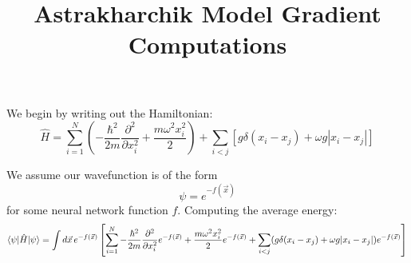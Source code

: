 \documentclass{notes}
\title{Astrakharchik Model Gradient Computations}
\date{}
\begin{document}
	We begin by writing out the Hamiltonian:
	$$\hat{H} = \sum_{i=1}^N \left(-\frac{\hbar^2}{2m}\frac{\partial^2}{\partial x_i^2} + \frac{m\omega^2x_i^2}{2}\right) + \sum_{i<j}\left[g\delta(x_i - x_j) + \omega g |x_i - x_j|\right]$$

	We assume our wavefunction is of the form
	$$\psi = e^{-f(\vec{x})}$$
	for some neural network function $f$. Computing the average energy:
	$$\braket{\psi|\hat{H}|\psi} = \int d\vec{x}\, e^{-f(\vec{x})} \left[\sum_{i=1}^N -\frac{\hbar^2}{2m}\frac{\partial^2}{\partial x_i^2}e^{-f(\vec{x})} + \frac{m\omega^2 x_i^2}{2}e^{-f(\vec{x})} + \sum_{i<j}(g\delta(x_i-x_j) + \omega g|x_i - x_j|)e^{-f(\vec{x})}\right]$$
\end{document}
